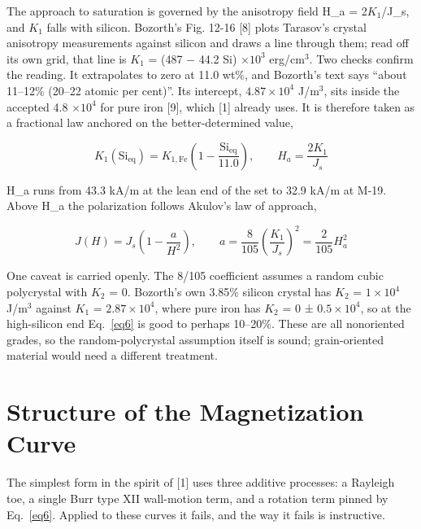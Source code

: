 \documentclass[
  11pt,
]{article}
\begin{document}
The approach to saturation is governed by the anisotropy field H\_a = 2\(K_1\)/J\_s, and \(K_1\) falls with silicon. Bozorth's Fig. 12-16 {[}8{]} plots Tarasov's crystal anisotropy measurements against silicon and draws a line through them; read off its own grid, that line is \(K_1\) = (487 \(-\) 44.2 Si) \(\times 10^{3}\) erg/cm\(^{3}\). Two checks confirm the reading. It extrapolates to zero at 11.0 wt\%, and Bozorth's text says ``about 11--12\% (20--22 atomic per cent)''. Its intercept, \(4.87\times10^{4}\) J/m\(^{3}\), sits inside the accepted 4.8 \(\times 10^{4}\) for pure iron {[}9{]}, which {[}1{]} already uses. It is therefore taken as a fractional law anchored on the better-determined value,

\begin{equation}\label{eq5}
K_1(\mathrm{Si_{eq}}) = K_{1,\mathrm{Fe}}\left(1 - \frac{\mathrm{Si_{eq}}}{11.0}\right), \qquad H_a = \frac{2K_1}{J_s}
\end{equation}

H\_a runs from 43.3 kA/m at the lean end of the set to 32.9 kA/m at M-19. Above H\_a the polarization follows Akulov's law of approach,

\begin{equation}\label{eq6}
J(H) = J_s\left(1-\frac{a}{H^{2}}\right), \qquad a = \frac{8}{105}\left(\frac{K_1}{J_s}\right)^{2} = \frac{2}{105}H_a^{2}
\end{equation}

One caveat is carried openly. The 8/105 coefficient assumes a random cubic polycrystal with \(K_2\) = 0. Bozorth's own 3.85\% silicon crystal has \(K_2\) = \(1\times10^{4}\) J/m\(^{3}\) against \(K_1\) = \(2.87\times10^{4}\), where pure iron has \(K_2\) = 0 ± \(0.5\times10^{4}\), so at the high-silicon end Eq.~\eqref{eq6} is good to perhaps 10--20\%. These are all nonoriented grades, so the random-polycrystal assumption itself is sound; grain-oriented material would need a different treatment.

\section{Structure of the Magnetization
Curve}\label{structure-of-the-magnetization-curve}

The simplest form in the spirit of {[}1{]} uses three additive processes: a Rayleigh toe, a single Burr type XII wall-motion term, and a rotation term pinned by Eq.~\eqref{eq6}. Applied to these curves it fails, and the way it fails is instructive.
\end{document}

